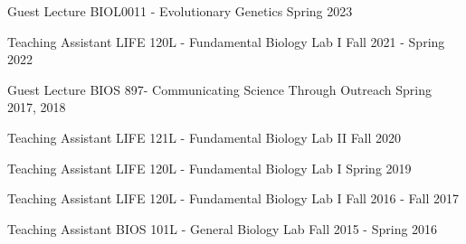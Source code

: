 

\begin{cvoutreaches}

  \cvoutreach
    {Guest Lecture}
    {BIOL0011 - Evolutionary Genetics}
    {Spring 2023}  

  \cvoutreach
    {Teaching Assistant}
    {LIFE 120L - Fundamental Biology Lab I}
    {Fall 2021 - Spring 2022}

  \cvoutreach
    {Guest Lecture}
    {BIOS 897- Communicating Science Through Outreach}
    {Spring 2017, 2018}

  \cvoutreach
    {Teaching Assistant}
    {LIFE 121L - Fundamental Biology Lab II}
    {Fall 2020}
    
  \cvoutreach
    {Teaching Assistant}
    {LIFE 120L - Fundamental Biology Lab I}
    {Spring 2019}
  
  \cvoutreach
   {Teaching Assistant}
    {LIFE 120L - Fundamental Biology Lab I}
    {Fall 2016 - Fall 2017}
    
  \cvoutreach
    {Teaching Assistant}
    {BIOS 101L - General Biology Lab}
    {Fall 2015 - Spring 2016}
\end{cvoutreaches}

